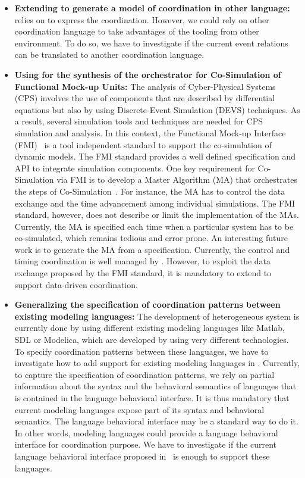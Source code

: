 \begin{itemize}
	\item \textbf{Extending \bcool to generate a model of coordination in other language:} \bcool relies on \ccsl to express the coordination. However, we could rely on other coordination language to take advantages of the tooling from other environment. To do so, we have to investigate if the current event relations can be translated to another coordination language.
	
	\item \textbf{Using \bcool for the synthesis of the orchestrator for Co-Simulation of Functional Mock-up Units:} The analysis of Cyber-Physical Systems (CPS) involves the use of components that are described by differential equations but also by using Discrete-Event Simulation (DEVS) techniques. As a result, several simulation tools and techniques are needed for CPS simulation and analysis. In this context, the Functional Mock-up Interface (FMI)~\cite{fmibib2} is a tool independent standard to support the co-simulation of dynamic models. The FMI standard provides a well defined specification and API to integrate simulation components. One key requirement for Co-Simulation via FMI is to develop a Master Algorithm (MA) that orchestrates the steps of Co-Simulation~\cite{fmibib}. For instance, the MA has to control the data exchange and the time advancement among individual simulations. The FMI standard, however, does not describe or limit the implementation of the MAs. Currently, the MA is specified each time when a particular system has to be co-simulated, which remains tedious and error prone. An interesting future work is to generate the MA from a \bcool specification. Currently, the control and timing coordination is well managed by \bcool. However, to exploit the data exchange proposed by the FMI standard, it is mandatory to extend \bcool to support data-driven coordination. 
	
	\item \textbf{Generalizing the specification of coordination patterns between existing modeling languages:} The development of heterogeneous system is currently done by using different existing modeling languages like Matlab, SDL or Modelica, which are developed by using very different technologies. To specify coordination patterns between these languages, we have to investigate how to add support for existing modeling languages in \bcool. Currently, to capture the specification of coordination patterns, we rely on partial information about the syntax and the behavioral semantics of languages that is contained in the language behavioral interface. It is thus mandatory that current modeling languages expose part of its syntax and behavioral semantics. The language behavioral interface may be a standard way to do it. In other words, modeling languages could provide a language behavioral interface for coordination purpose. We have to investigate if the current language behavioral interface proposed in~\cite{sle13-combemale} is enough to support these languages.    
				

\end{itemize}
